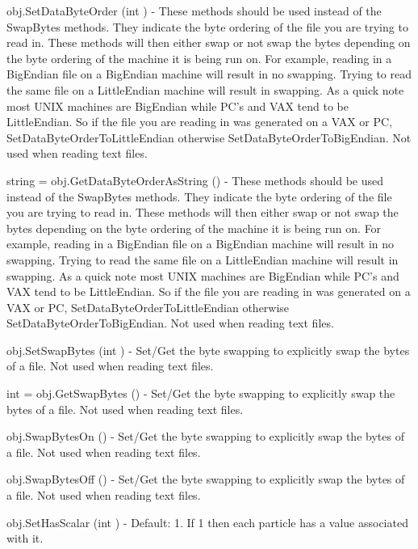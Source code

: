 \begin{DoxyItemize}
\item {\ttfamily obj.\-Set\-Data\-Byte\-Order (int )} -\/ These methods should be used instead of the Swap\-Bytes methods. They indicate the byte ordering of the file you are trying to read in. These methods will then either swap or not swap the bytes depending on the byte ordering of the machine it is being run on. For example, reading in a Big\-Endian file on a Big\-Endian machine will result in no swapping. Trying to read the same file on a Little\-Endian machine will result in swapping. As a quick note most U\-N\-I\-X machines are Big\-Endian while P\-C's and V\-A\-X tend to be Little\-Endian. So if the file you are reading in was generated on a V\-A\-X or P\-C, Set\-Data\-Byte\-Order\-To\-Little\-Endian otherwise Set\-Data\-Byte\-Order\-To\-Big\-Endian. Not used when reading text files.  
\item {\ttfamily string = obj.\-Get\-Data\-Byte\-Order\-As\-String ()} -\/ These methods should be used instead of the Swap\-Bytes methods. They indicate the byte ordering of the file you are trying to read in. These methods will then either swap or not swap the bytes depending on the byte ordering of the machine it is being run on. For example, reading in a Big\-Endian file on a Big\-Endian machine will result in no swapping. Trying to read the same file on a Little\-Endian machine will result in swapping. As a quick note most U\-N\-I\-X machines are Big\-Endian while P\-C's and V\-A\-X tend to be Little\-Endian. So if the file you are reading in was generated on a V\-A\-X or P\-C, Set\-Data\-Byte\-Order\-To\-Little\-Endian otherwise Set\-Data\-Byte\-Order\-To\-Big\-Endian. Not used when reading text files.  
\item {\ttfamily obj.\-Set\-Swap\-Bytes (int )} -\/ Set/\-Get the byte swapping to explicitly swap the bytes of a file. Not used when reading text files.  
\item {\ttfamily int = obj.\-Get\-Swap\-Bytes ()} -\/ Set/\-Get the byte swapping to explicitly swap the bytes of a file. Not used when reading text files.  
\item {\ttfamily obj.\-Swap\-Bytes\-On ()} -\/ Set/\-Get the byte swapping to explicitly swap the bytes of a file. Not used when reading text files.  
\item {\ttfamily obj.\-Swap\-Bytes\-Off ()} -\/ Set/\-Get the byte swapping to explicitly swap the bytes of a file. Not used when reading text files.  
\item {\ttfamily obj.\-Set\-Has\-Scalar (int )} -\/ Default\-: 1. If 1 then each particle has a value associated with it.  

\end{DoxyItemize}

